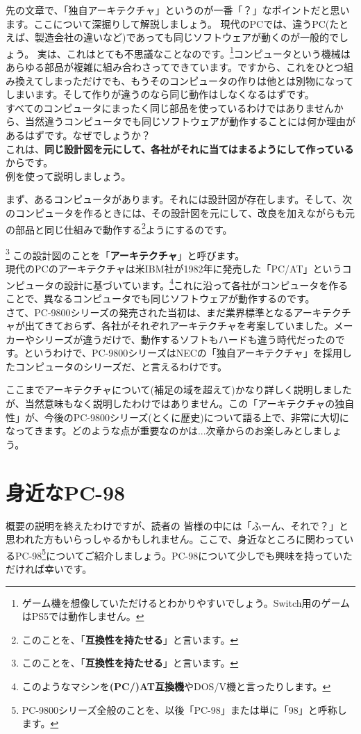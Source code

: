 \documentclass[b5paper,9pt,platex,dvipdfmx]{jsarticle}
\begin{document}
\begin{multicols}{3}
先の文章で、「独自アーキテクチャ」というのが一番「？」なポイントだと思います。ここについて深掘りして解説しましょう。
現代のPCでは、違うPC(たとえば、製造会社の違いなど)であっても同じソフトウェアが動くのが一般的でしょう。
実は、これはとても不思議なことなのです。\footnote{ゲーム機を想像していただけるとわかりやすいでしょう。Switch用のゲームはPS5では動作しません。}コンピュータという機械はあらゆる部品が複雑に組み合わさってできています。ですから、これをひとつ組み換えてしまっただけでも、もうそのコンピュータの作りは他とは別物になってしまいます。そして作りが違うのなら同じ動作はしなくなるはずです。\\
すべてのコンピュータにまったく同じ部品を使っているわけではありませんから、当然違うコンピュータでも同じソフトウェアが動作することには何か理由があるはずです。なぜでしょうか？\\
これは、{\bf 同じ設計図を元にして、各社がそれに当てはまるようにして作っている}からです。\\
例を使って説明しましょう。\\
\begin{screen}
まず、あるコンピュータがあります。それには設計図が存在します。そして、次のコンピュータを作るときには、その設計図を元にして、改良を加えながらも元の部品と同じ仕組みで動作する\footnote{このことを、「{\bf 互換性を持たせる}」と言います。}ようにするのです。
\end{screen}
\footnote{このことを、「{\bf 互換性を持たせる}」と言います。}
この設計図のことを「{\bf アーキテクチャ}」と呼びます。\\
現代のPCのアーキテクチャは米IBM社が1982年に発売した「PC/AT」というコンピュータの設計に基づいています。\footnote{このようなマシンを{\bf(PC/)AT互換機}やDOS/V機と言ったりします。}これに沿って各社がコンピュータを作ることで、異なるコンピュータでも同じソフトウェアが動作するのです。\\
さて、PC-9800シリーズの発売された当初は、まだ業界標準となるアーキテクチャが出てきておらず、各社がそれぞれアーキテクチャを考案していました。メーカーやシリーズが違うだけで、動作するソフトもハードも違う時代だったのです。というわけで、PC-9800シリーズはNECの「独自アーキテクチャ」を採用したコンピュータのシリーズだ、と言えるわけです。

ここまでアーキテクチャについて(補足の域を超えて)かなり詳しく説明しましたが、当然意味もなく説明したわけではありません。この「アーキテクチャの独自性」が、今後のPC-9800シリーズ(とくに歴史)について語る上で、非常に大切になってきます。どのような点が重要なのかは...次章からのお楽しみとしましょう。
\part{身近なPC-98}
\setcounter{section}{0}
概要の説明を終えたわけですが、読者の 皆様の中には「ふーん、それで？」と思われた方もいらっしゃるかもしれません。ここで、身近なところに関わっているPC-98\footnote{PC-9800シリーズ全般のことを、以後「PC-98」または単に「98」と呼称します。}についてご紹介しましょう。PC-98について少しでも興味を持っていただければ幸いです。

\end{multicols}
\end{document}
